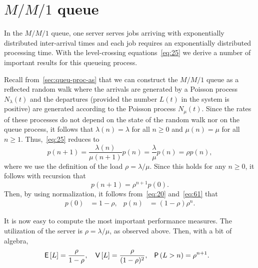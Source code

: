 \section
{$M/M/1$ queue}
\label{sec:mm1}




In the $M/M/1$ queue, one server serves jobs arriving with exponentially distributed inter-arrival times and each job requires an exponentially distributed processing time.
With the level-crossing equations~\cref{eq:25} we derive a number of important results for this queueing process.

Recall from~\cref{sec:queu-proc-as} that we can construct the $M/M/1$ queue as a reflected random walk where the arrivals are generated by a Poisson process $N_\lambda(t)$ and the departures (provided the number $L(t)$ in the system is positive) are generated according to the Poisson process $N_\mu(t)$.
Since the rates of these processes do not depend on the state of the random walk nor on the queue process, it follows that $\lambda(n)=\lambda$ for all $n \geq 0$ and $\mu(n)=\mu$ for all $n \geq 1$.
Thus,~\cref{eq:25} reduces to
\begin{equation*}
 p(n+1) = \frac{\lambda(n)}{\mu(n+1)} p(n) = \frac{\lambda}{\mu} p(n) = \rho p(n),
\end{equation*}
where we use the definition of the load $\rho=\lambda/\mu$. Since this
holds for any $n\geq 0$, it follows with recursion that
\begin{equation*}
 p(n+1) = \rho^{n+1} p(0).
\end{equation*}
Then, by using normalization, 
it follows from~\cref{eq:20} and~\cref{eq:61} that
\begin{align}\label{eq:23}
p(0) &=1-\rho, & p(n) &= (1-\rho)\rho^{n}.
\end{align}

It is now easy to compute the most important performance measures.
The utilization of the server is $\rho=\lambda/\mu$, as observed above.
Then, with a bit of algebra,
\begin{align}\label{eq:el}
 \E L &= \frac \rho{1-\rho}, & \V L &= \frac{\rho}{(1-\rho)^2}, & \P{L> n} &= \rho^{n+1}.
\end{align}




